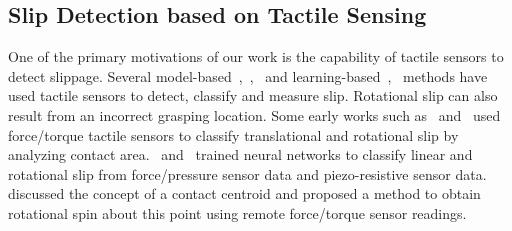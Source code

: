 \subsection{Slip Detection based on Tactile Sensing}
One of the primary motivations of our work is the capability of tactile sensors to detect slippage. 
Several model-based~\cite{review},~\cite{piezoelectret},~\cite{BioTac} and learning-based~\cite{calib_slip},~\cite{learn_slip_detect} methods have used tactile sensors to detect, classify and measure slip. 
Rotational slip can also result from an incorrect grasping location.  Some early works such as~\cite{3-axis_rotation_slip} and~\cite{tactile_force} used force/torque tactile sensors to classify translational and rotational slip by analyzing contact area.~\cite{Biomimetic} and~\cite {Tactile_CNN_rotation} trained neural networks to classify linear and rotational slip from force/pressure sensor data and piezo-resistive sensor data. 
\cite{ContactCentroid} discussed the concept of a contact centroid and proposed a method to obtain rotational spin about this point using remote force/torque sensor readings.


